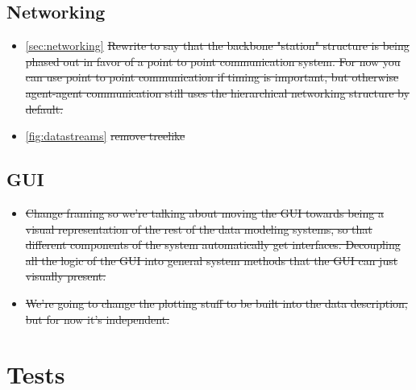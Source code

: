 \subsection{Networking}

\begin{itemize}
\item \ref{sec:networking} \sout{Rewrite to say that the backbone "station" structure is being phased out in favor of a point to point communication system. For now you can use point to point communication if timing is important, but otherwise agent-agent communication still uses the hierarchical networking structure by default.}
\item \ref{fig:datastreams} \sout{remove treelike}
\end{itemize}

\subsection{GUI}

\begin{itemize}
\item \sout{Change framing so we're talking about moving the GUI towards being a visual representation of the rest of the data modeling systems, so that different components of the system automatically get interfaces. Decoupling all the logic of the GUI into general system methods that the GUI can just visually present.}
\item \sout{We're going to change the plotting stuff to be built into the data description, but for now it's independent.}
\end{itemize}

\section{Tests}

